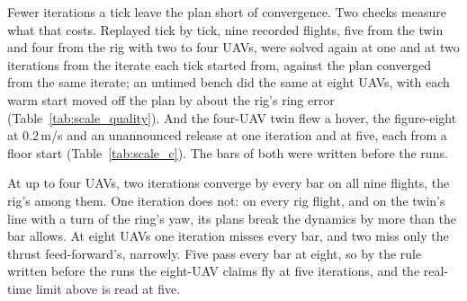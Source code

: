 Fewer iterations a tick leave the plan short of convergence. Two checks measure what that costs. Replayed tick by
tick, nine recorded flights, five from the twin and four from the rig with two to four UAVs, were solved again at one
and at two iterations from the iterate each tick started from, against the plan converged from the same iterate; an
untimed bench did the same at eight UAVs, with each warm start moved off the plan by about the rig's ring error
(Table~\ref{tab:scale_quality}). And the four-UAV twin flew a hover, the figure-eight at 0.2\,m/s and an unannounced
release at one iteration and at five, each from a floor start (Table~\ref{tab:scale_c}). The bars of both were written
before the runs.

At up to four UAVs, two iterations converge by every bar on all nine flights, the rig's among them. One iteration does
not: on every rig flight, and on the twin's line with a turn of the ring's yaw, its plans break the dynamics by more
than the bar allows. At eight UAVs one iteration misses every bar, and two miss only the thrust feed-forward's,
narrowly. Five pass every bar at eight, so by the rule written before the runs the eight-UAV claims fly at five
iterations, and the real-time limit above is read at five.

